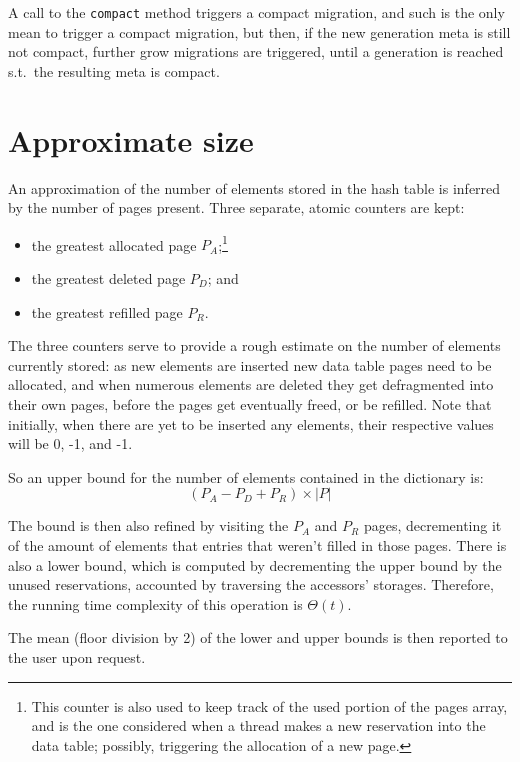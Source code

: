 A call to the \texttt{compact} method triggers a compact migration, and such is the only mean to trigger a compact migration, but then, if the new generation meta is still not compact, further grow migrations are triggered, until a generation is reached s.t.\ the resulting meta is compact.


\section{Approximate size}\label{sec:approximate-size}

An approximation of the number of elements stored in the hash table is inferred by the number of pages present.
Three separate, atomic counters are kept:

\begin{itemize}
	\item the greatest allocated page $P_A$;\footnote{%
		This counter is also used to keep track of the used portion of the pages array, and is the one considered when a thread makes a new reservation into the data table; possibly, triggering the allocation of a new page.
	}
	\item the greatest deleted page $P_D$; and
	\item the greatest refilled page $P_R$.
\end{itemize}

The three counters serve to provide a rough estimate on the number of elements currently stored: as new elements are inserted new data table pages need to be allocated, and when numerous elements are deleted they get defragmented into their own pages, before the pages get eventually freed, or be refilled.
Note that initially, when there are yet to be inserted any elements, their respective values will be 0, -1, and -1.

So an upper bound for the number of elements contained in the dictionary is:
\[
(P_A - P_D + P_R) \times |P|
\]

The bound is then also refined by visiting the $P_A$ and $P_R$ pages, decrementing it of the amount of elements that entries that weren't filled in those pages.
There is also a lower bound, which is computed by decrementing the upper bound by the unused reservations, accounted by traversing the accessors' storages.
Therefore, the running time complexity of this operation is $\Theta(t)$.

The mean (floor division by 2) of the lower and upper bounds is then reported to the user upon request.

